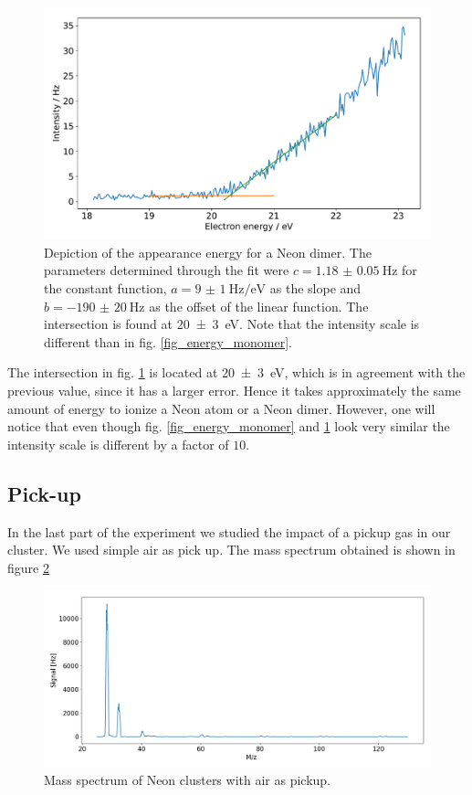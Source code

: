 \documentclass[a4paper,10pt]{article}
\begin{document}
\begin{figure}[H]
	\centering
	\includegraphics[width = 0.8 \textwidth]{energy_ne2.pdf}
	\caption{Depiction of the appearance energy for a Neon dimer. The parameters determined through the fit were $c = \SI{1.18(5)}{\hertz}$ for the constant function, $a = \SI{9(1)}{\hertz \per \electronvolt}$ as the slope and $b = \SI{-190(20)}{\hertz}$ as the offset of the linear function. The intersection is found at \SI{20(3)}{\electronvolt}. Note that the intensity scale is different than in fig. \ref{fig_energy_monomer}. }
	\label{fig_energy_dimer}
\end{figure}
The intersection in fig. \ref{fig_energy_dimer} is located at \SI{20(3)}{\electronvolt}, which is in agreement with the previous value, since it has a larger error. Hence it takes approximately the same amount of energy to ionize a Neon atom or a Neon dimer. However, one will notice that even though fig. \ref{fig_energy_monomer} and \ref{fig_energy_dimer} look very similar the intensity scale is different by a factor of $10$. 

\subsection{Pick-up}
In the last part of the experiment we studied the impact of a pickup gas in our cluster. We used simple air as pick up. The mass spectrum obtained is shown in figure \ref{pickup}
\begin{figure}[H]
	\centering
	\includegraphics[width =\textwidth]{pickup}
	\caption{Mass spectrum of Neon clusters with air as pickup.}
	\label{pickup}
\end{figure}
\end{document}
